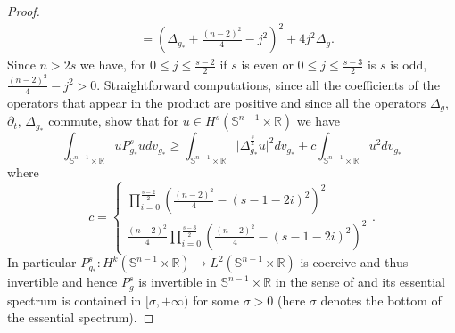 \documentclass[10pt]{amsart}
\numberwithin{equation}{section}
\newcommand{\R}{\mathbb{R}}
\theoremstyle{plain}
\theoremstyle{remark}
\begin{document}
\begin{proof}
\begin{equation*}
\begin{split}
& = \left(\Delta_{g_*} + \frac{(n-2)^2}{4} - j^2 \right)^2 + 4 j^2 \Delta_g. 
\end{split}\end{equation*}
Since $n >2s$ we have, for $0 \le j \le \frac{s-2}{2}$ if $s$ is even or $0 \le j \le \frac{s-3}{2}$ is $s$ is odd, $\frac{(n-2)^2}{4} - j^2  > 0$. Straightforward computations, since all the coefficients of the operators that appear in the product are positive and since all the operators $\Delta_{g}$, $\partial_t$, $\Delta_{g_*}$ commute, show that for $u \in H^s(\mathbb{S}^{n-1} \times \R)$ we have
$$ \int_{\mathbb{S}^{n-1} \times \R} u P_{g_*}^s u dv_{g_*} \geq  \int_{\mathbb{S}^{n-1} \times \R} \vert \Delta_{g_*}^{\frac{s}{2}} u \vert^2 dv_{g_*} + c \int_{\mathbb{S}^{n-1} \times \R}  u^2 dv_{g_*}  $$
where
$$ c = \begin{cases}\prod_{i=0}^{\frac{s-2}{2}} \left( \frac{(n-2)^2}{4} - (s-1-2i)^2 \right)^2 \\ \frac{(n-2)^2}{4} \prod_{i=0}^{\frac{s-3}{2}} \left( \frac{(n-2)^2}{4} - (s-1-2i)^2 \right)^2 \end{cases} .$$
In particular $P_{g_*}^s: H^k(\mathbb{S}^{n-1} \times \R) \to L^2(\mathbb{S}^{n-1} \times \R)$ is coercive and thus invertible and hence $P_g^s$ is invertible in $\mathbb{S}^{n-1} \times \R$ in the sense of \cite[Definition 2.4]{AmmannJammes} and its essential spectrum is contained in $[\sigma, + \infty)$ for some $\sigma >0$ (here $\sigma$ denotes the bottom of the essential spectrum). 


\end{proof}
\end{document}
